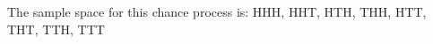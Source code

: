 \documentclass[preview]{standalone}
\begin{document}
\begin{center}
The sample space for this chance process is: HHH, HHT, HTH, THH, HTT, THT, TTH, TTT
\end{center}
\end{document}
